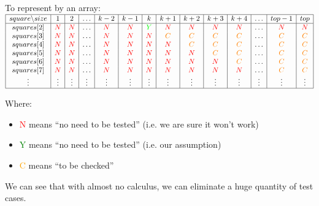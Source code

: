 \documentclass{article}
\begin{document}
            To represent by an array:\\
            $\begin{array}{|c|c|c|c|c|c|c|c|c|c|c|c|c|c|c|}
                \hline
                square\backslash size&1&2&\dots&k-2&k-1&k&k+1&k+2&k+3&k+4&\dots&top-1&top\\
                \hline
                squares[2]&\textcolor{red}{N}&\textcolor{red}{N}&\dots&\textcolor{red}{N}&\textcolor{red}{N}&\textcolor{green}{Y}&\textcolor{red}{N}&\textcolor{red}{N}&\textcolor{red}{N}&\textcolor{red}{N}&\dots&\textcolor{red}{N}&\textcolor{red}{N}\\
                squares[3]&\textcolor{red}{N}&\textcolor{red}{N}&\dots&\textcolor{red}{N}&\textcolor{red}{N}&\textcolor{red}{N}&\textcolor{orange}{C}&\textcolor{orange}{C}&\textcolor{orange}{C}&\textcolor{orange}{C}&\dots&\textcolor{orange}{C}&\textcolor{orange}{C}\\
                squares[4]&\textcolor{red}{N}&\textcolor{red}{N}&\dots&\textcolor{red}{N}&\textcolor{red}{N}&\textcolor{red}{N}&\textcolor{red}{N}&\textcolor{orange}{C}&\textcolor{orange}{C}&\textcolor{orange}{C}&\dots&\textcolor{orange}{C}&\textcolor{orange}{C}\\
                squares[5]&\textcolor{red}{N}&\textcolor{red}{N}&\dots&\textcolor{red}{N}&\textcolor{red}{N}&\textcolor{red}{N}&\textcolor{red}{N}&\textcolor{red}{N}&\textcolor{orange}{C}&\textcolor{orange}{C}&\dots&\textcolor{orange}{C}&\textcolor{orange}{C}\\
                squares[6]&\textcolor{red}{N}&\textcolor{red}{N}&\dots&\textcolor{red}{N}&\textcolor{red}{N}&\textcolor{red}{N}&\textcolor{red}{N}&\textcolor{red}{N}&\textcolor{red}{N}&\textcolor{orange}{C}&\dots&\textcolor{orange}{C}&\textcolor{orange}{C}\\
                squares[7]&\textcolor{red}{N}&\textcolor{red}{N}&\dots&\textcolor{red}{N}&\textcolor{red}{N}&\textcolor{red}{N}&\textcolor{red}{N}&\textcolor{red}{N}&\textcolor{red}{N}&\textcolor{red}{N}&\dots&\textcolor{orange}{C}&\textcolor{orange}{C}\\
                \vdots&\vdots&\vdots&\vdots&\vdots&\vdots&\vdots&\vdots&\vdots&\vdots&\vdots&\vdots&\vdots&\vdots\\
                \hline
            \end{array}$

            Where:
            \begin{itemize}
                \item \textcolor{red}{N} means ``no need to be tested'' (i.e. we are sure it won't work)
                \item \textcolor{green}{Y} means ``no need to be tested'' (i.e. our assumption)
                \item \textcolor{orange}{C} means ``to be checked''
            \end{itemize}

            We can see that with almost no calculus, we can eliminate a huge quantity of test cases.
\end{document}
